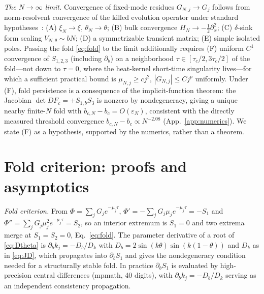 \documentclass[reprint,amsmath,amssymb,aps,prresearch,longbibliography]{revtex4-2}
\begin{document}
\emph{The $N\to\infty$ limit.} Convergence of fixed-mode residues $G_{N,j}\to G_j$ follows from
norm-resolvent convergence of the killed evolution operator under standard
hypotheses~\cite{Kato1995,Albeverio2005}: (A) $\xi_N\to\xi$,
$\theta_N\to\theta$; (B) bulk convergence $H_N\to-\tfrac12\partial_x^2$; (C) $\delta$-sink form scaling
$V_{N,\theta}\sim bN$; (D) a symmetrizable transient matrix; (E) simple isolated poles. Passing the
fold \eqref{eq:fold} to the limit additionally requires (F) uniform $C^1$ convergence of $S_{1,2,3}$
(including $\partial_b$) on a neighborhood $\tau\in[\tau_c/2,3\tau_c/2]$ of the fold---not down to
$\tau=0$, where the heat-kernel short-time singularity lives---for which a sufficient practical bound is
$\mu_{N,j}\ge cj^2$, $|G_{N,j}|\le Cj^p$ uniformly. Under (F), fold persistence is a consequence of the
implicit-function theorem: the Jacobian $\det DF_c=+S_{1,b}S_3$ is nonzero by nondegeneracy, giving a
unique nearby finite-$N$ fold with $b_{c,N}-b_c=O(\varepsilon_N)$, consistent with the directly
measured threshold convergence $b_{c,N}-b_c\propto N^{-2.08}$ (App.~\ref{app:numerics}). We state (F)
as a hypothesis, supported by the numerics, rather than a theorem.

\section{Fold criterion: proofs and asymptotics}\label{app:existence}
\emph{Fold criterion.} From $\Phi=\sum_j G_j e^{-\mu_j\tau}$, $\Phi'=-\sum_j G_j\mu_j e^{-\mu_j\tau}
=-S_1$ and $\Phi''=\sum_j G_j\mu_j^2 e^{-\mu_j\tau}=S_2$, so an interior extremum is $S_1=0$ and two
extrema merge at $S_1=S_2=0$, Eq.~\eqref{eq:fold}. The parameter derivative of a root of
\eqref{eq:Dtheta} is $\partial_b k_j=-D_b/D_k$ with $D_b=2\sin(k\theta)\sin(k(1-\theta))$ and $D_k$ as
in \eqref{eq:JD}, which propagates into $\partial_b S_1$ and gives the nondegeneracy condition needed
for a structurally stable fold. In practice $\partial_bS_1$ is evaluated by high-precision central
differences (mpmath, 40 digits), with $\partial_bk_j=-D_b/D_k$ serving as an independent consistency
propagation.
\end{document}
